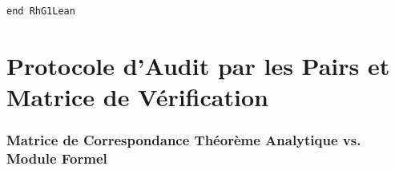 \documentclass[11pt,a4paper]{article}
\theoremstyle{definition}
\theoremstyle{remark}
\begin{document}
\begin{lstlisting}[language=Lean4]
end RhG1Lean
\end{lstlisting}

\newpage

\part{Protocole d'Audit par les Pairs et Matrice de Vérification}

\section{Matrice de Correspondance Théorème Analytique vs. Module Formel}
\end{document}
